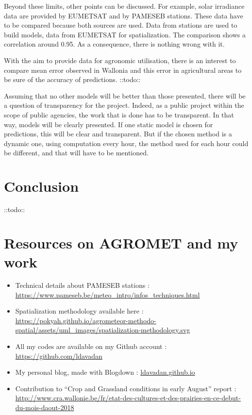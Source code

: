 \documentclass[12pt,twoside]{reedthesis}
\theoremstyle{definition}
\theoremstyle{definition}
\theoremstyle{definition}
\theoremstyle{remark}
\begin{document}
Beyond these limits, other points can be discussed. For example, solar
irradiance data are provided by EUMETSAT and by PAMESEB stations. These
data have to be compared because both sources are used. Data from
stations are used to build models, data from EUMETSAT for
spatialization. The comparison shows a correlation around 0.95. As a
consequence, there is nothing wrong with it.

With the aim to provide data for agronomic utilisation, there is an
interest to compare mean error observed in Wallonia and this error in
agricultural areas to be sure of the accuracy of predictions. ::todo::

Assuming that no other models will be better than those presented, there
will be a question of transparency for the project. Indeed, as a public
project within the scope of public agencies, the work that is done has
to be transparent. In that way, models will be clearly presented. If one
static model is chosen for predictions, this will be clear and
transparent. But if the chosen method is a dynamic one, using
computation every hour, the method used for each hour could be
different, and that will have to be mentioned.

\chapter*{Conclusion}\label{conclusion}

::todo::

\appendix

\chapter{Resources on AGROMET and my
work}\label{resources-on-agromet-and-my-work}
\begin{itemize}
\item
  Technical details about PAMESEB stations :
  \url{https://www.pameseb.be/meteo_intro/infos_techniques.html}
\item
  Spatialization methodology available here :
  \url{https://pokyah.github.io/agrometeor-methodo-spatial/assets/uml_images/spatialization-methodology.svg}
\item
  All my codes are available on my Github account :
  \url{https://github.com/ldavadan}
\item
  My personal blog, made with Blogdown : \url{ldavadan.github.io}
\item
  Contribution to ``Crop and Grassland conditions in early August''
  report :
  \url{http://www.cra.wallonie.be/fr/etat-des-cultures-et-des-prairies-en-ce-debut-du-mois-daout-2018}
\end{itemize}
\end{document}
